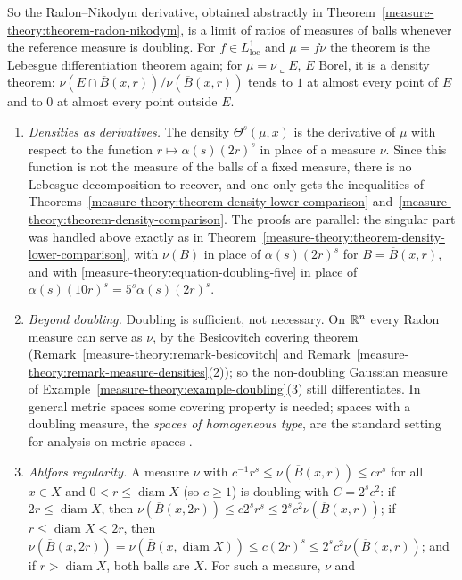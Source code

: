 So the Radon--Nikodym derivative, obtained abstractly in Theorem~\ref{measure-theory:theorem-radon-nikodym}, is a limit of ratios of measures of balls whenever the reference measure is doubling. For
$f \in L^1_{\mathrm{loc}}$ and $\mu = f\nu$ the theorem is the Lebesgue differentiation theorem again; for $\mu = \nu\llcorner E$, $E$ Borel, it is a density theorem:
$\nu(E \cap \overline{B}(x, r))/\nu(\overline{B}(x, r))$ tends to $1$ at almost every point of $E$ and to $0$ at almost every point outside $E$.

\begin{remark}\label{measure-theory:remark-doubling}
\begin{enumerate}
\item \emph{Densities as derivatives.} The density $\Theta^s(\mu, x)$ is the derivative of $\mu$ with respect to the function $r \mapsto \alpha(s)(2r)^s$ in place of a measure $\nu$. Since this function
is not the measure of the balls of a fixed measure, there is no Lebesgue decomposition to recover, and one only gets the inequalities of Theorems~\ref{measure-theory:theorem-density-lower-comparison}
and~\ref{measure-theory:theorem-density-comparison}. The proofs are parallel: the singular part was handled above exactly as in Theorem~\ref{measure-theory:theorem-density-lower-comparison}, with
$\nu(B)$ in place of $\alpha(s)(2r)^s$ for $B = \overline{B}(x, r)$, and with \eqref{measure-theory:equation-doubling-five} in place of $\alpha(s)(10r)^s = 5^s\alpha(s)(2r)^s$.
\item \emph{Beyond doubling.} Doubling is sufficient, not necessary. On $\mathbb{R}^n$ every Radon measure can serve as $\nu$, by the Besicovitch covering theorem
(Remark~\ref{measure-theory:remark-besicovitch} and Remark~\ref{measure-theory:remark-measure-densities}(2)); so the non-doubling Gaussian measure of Example~\ref{measure-theory:example-doubling}(3)
still differentiates. In general metric spaces some covering property is needed; spaces with a doubling measure, the \emph{spaces of homogeneous type}, are the standard setting for analysis on metric
spaces \cite[Chapter 1]{heinonen-2001}.
\item \emph{Ahlfors regularity.} A measure $\nu$ with $c^{-1}r^s \leq \nu(\overline{B}(x, r)) \leq cr^s$ for all $x \in X$ and $0 < r \leq \operatorname{diam}X$ (so $c \geq 1$) is doubling with
$C = 2^sc^2$: if $2r \leq \operatorname{diam}X$, then $\nu(\overline{B}(x, 2r)) \leq c2^sr^s \leq 2^sc^2\nu(\overline{B}(x, r))$; if $r \leq \operatorname{diam}X < 2r$, then
$\nu(\overline{B}(x, 2r)) = \nu(\overline{B}(x, \operatorname{diam}X)) \leq c(2r)^s \leq 2^sc^2\nu(\overline{B}(x, r))$; and if $r > \operatorname{diam}X$, both balls are $X$. For such a measure, $\nu$ and

\end{enumerate}
\end{remark}
